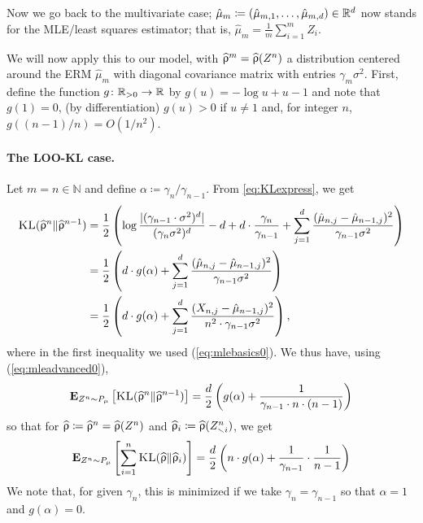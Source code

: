 \documentclass{article}
\newcommand{\hro}{\what{\uprho}}
\begin{document}
Now we go back to the multivariate case; $\hat{\mu}_m \coloneqq (\hat \mu_{m,1}, \dots, \hat\mu_{m,d})\in {\mathbb R}^d$ now stands for the MLE/least squares estimator; that is, $\hat\mu_m = \frac{1}{m} \sum_{i=1}^m Z_i$.

We will now apply this to our model, with $\hro^m= \hro(Z^n)$ a distribution
centered around the ERM $\hat{\mu}_m$ with diagonal covariance matrix
with entries $\gamma_m \sigma^2$. First, define the function
$g\colon {\mathbb R}_{>0} \rightarrow {\mathbb R}$ by $g(u) = - \log u + u-1$ and
note that $g(1) = 0$, (by differentiation) $g(u) > 0$ if $u \neq 1$
and, for integer $n$, $g((n-1)/n) = O(1/n^2)$.

\paragraph{The LOO-KL case.} Let $m=n \in \mathbb{N}$ and define $\alpha \coloneqq \gamma_n/\gamma_{n-1}$. From \eqref{eq:KLexpress}, we get
\begin{align}
\KL(\hro^n \| \hro^{n-1}) & = \frac{1}{2} \left(\log \frac{| (\gamma_{n-1} \cdot \sigma^2)^d |}{
	(\gamma_n \sigma^2)^d} - d + d
\cdot \frac{\gamma_n}{\gamma_{n-1}}
+ \sum_{j=1}^d \frac{(\hat{\mu}_{n,j} - \hat{\mu}_{n-1,j})^2}{\gamma_{n-1} \sigma^2}\right) \nonumber \\ 
& =  \frac{1}{2} \left( d \cdot g(\alpha) + \sum_{j=1}^d \frac{(\hat{\mu}_{n,j} - \hat{\mu}_{n-1,j})^2}{ \gamma_{n-1} \sigma^2}\right) \nonumber \\
& =  \frac{1}{2} \left( d \cdot g(\alpha) + \sum_{j=1}^d \frac{(X_{n,j} - \hat{\mu}_{n-1,j})^2}{n^2 \cdot \gamma_{n-1} \sigma^2}\right),                       \nonumber
\end{align}
where in the first inequality we used (\ref{eq:mlebasics0}).
We thus have, using (\ref{eq:mleadvanced0}), 
\begin{align*}
{\bf E}_{Z^n \sim P_{\mu}}  \left[  \KL(\hro^n \| \hro^{n-1})  \right]   =  \frac{d}{2} \left(
g(\alpha) + \frac{1}{ \gamma_{n-1} \cdot n \cdot (n-1)}\right)
\end{align*}
so that for $\hro \coloneqq \hro^n= \hro(Z^n)$ and $\hro_i \coloneqq \hro(Z^{n}_{\smallsetminus i})$, we get 
\begin{align}
{\bf E}_{Z^n \sim P_{\mu}}  \left[  \sum_{i=1}^n \KL(\hro \| \hro_{i}) \right]
=  \frac{d}{2} \left(n \cdot g(\alpha)  +
\frac{1}{\gamma_{n-1}} \cdot \frac{1}{n-1} \right)
\label{eq:sumKLs0}
\end{align}
We note that, for given $\gamma_n$, this is minimized if we take
$\gamma_n = \gamma_{n-1}$ so that $\alpha=1$ and $g(\alpha)=0$.
\end{document}
